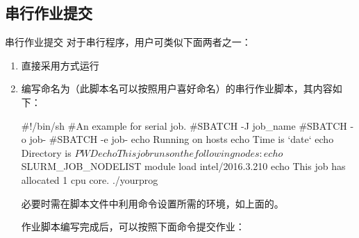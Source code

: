 \subsection{串行作业提交}
\begin{frame}[fragile]{串行作业提交}
对于串行程序，用户可类似下面两者之一：
\begin{enumerate}
	\item 直接采用方式运行
	\item 编写命名为（此脚本名可以按照用户喜好命名）的串行作业脚本，其内容如下：
\begin{SH}
#!/bin/sh
#An example for serial job.
#SBATCH -J job_name
#SBATCH -o job-%
#SBATCH -e job-%
echo Running on hosts 
echo Time is `date`
echo Directory is $PWD
echo This job runs on the following nodes:
echo $SLURM_JOB_NODELIST
module load intel/2016.3.210
echo This job has allocated 1 cpu core.
./yourprog
\end{SH}
必要时需在脚本文件中利用命令设置所需的环境，如上面的。

作业脚本编写完成后，可以按照下面命令提交作业：

\end{enumerate}


\end{frame}

